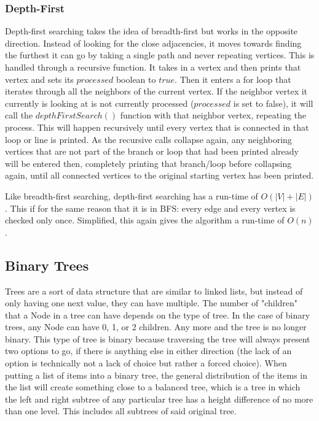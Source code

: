 \documentclass[letterpaper, 10pt,DIV=13]{scrartcl}
\numberwithin{equation}{section} %
\numberwithin{figure}{section} %
\numberwithin{table}{section} %
\begin{document}
\subsubsection{Depth-First}
Depth-first searching takes the idea of breadth-first but works in the opposite direction. Instead of looking for the close adjacencies, it moves towards finding the furthest it can go by taking a single path and never repeating vertices. This is handled through a recursive function. It takes in a vertex and then prints that vertex and sets its $processed$ boolean to $true$. Then it enters a for loop that iterates through all the neighbors of the current vertex. If the neighbor vertex it currently is looking at is not currently processed ($processed$ is set to false), it will call the $depthFirstSearch()$ function with that neighbor vertex, repeating the process. This will happen recursively until every vertex that is connected in that loop or line is printed. As the recursive calls collapse again, any neighboring vertices that are not part of the branch or loop that had been printed already will be entered then, completely printing that branch/loop before collapsing again, until all connected vertices to the original starting vertex has been printed.

Like breadth-first searching, depth-first searching has a run-time of $O(|V| + |E|)$. This if for the same reason that it is in BFS: every edge and every vertex is checked only once. Simplified, this again gives the algorithm a run-time of $O(n)$.

\subsection{Binary Trees}
Trees are a sort of data structure that are similar to linked lists, but instead of only having one next value, they can have multiple. The number of "children" that a Node in a tree can have depends on the type of tree. In the case of binary trees, any Node can have 0, 1, or 2 children. Any more and the tree is no longer binary. This type of tree is binary because traversing the tree will always present two options to go, if there is anything else in either direction (the lack of an option is technically not a lack of choice but rather a forced choice). When putting a list of items into a binary tree, the general distribution of the items in the list will create something close to a balanced tree, which is a tree in which the left and right subtree of any particular tree has a height difference of no more than one level. This includes all subtrees of said original tree.
\end{document}

